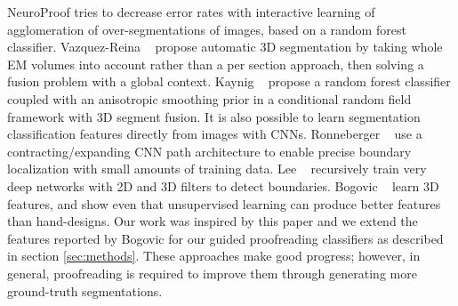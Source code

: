 NeuroProof \cite{neuroproof2013} tries to decrease error rates with interactive learning of agglomeration of over-segmentations of images, based on a random forest classifier. Vazquez-Reina \etal~\cite{amelio_segmentation} propose automatic 3D segmentation by taking whole EM volumes into account rather than a per section approach, then solving a fusion problem with a global context. Kaynig \etal~\cite{kaynig10} propose a random forest classifier coupled with an anisotropic smoothing prior in a conditional random field framework with 3D segment fusion. It is also possible to learn segmentation classification features directly from images with CNNs. Ronneberger \etal~\cite{RonnebergerFB15} use a contracting/expanding CNN path architecture to enable precise boundary localization with small amounts of training data. Lee \etal~\cite{lee2015recursive} recursively train very deep networks with 2D and 3D filters to detect boundaries. Bogovic \etal~\cite{BogovicHJ13} learn 3D features, and show even that unsupervised learning can produce better features than hand-designs. Our work was inspired by this paper and we extend the features reported by Bogovic \etal for our guided proofreading classifiers as described in section \ref{sec:methods}.
These approaches make good progress; however, in general, proofreading is required to improve them through generating more ground-truth segmentations. 

